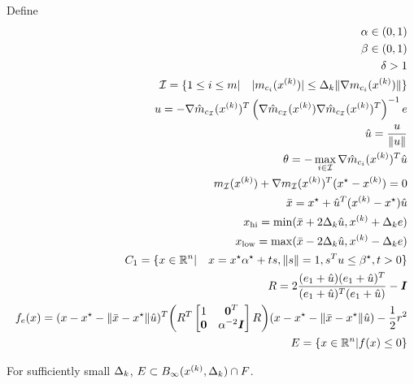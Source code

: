 % 
\begin{theorem}




Define 
\begin{align*}
\alpha \in (0, 1) \\
\beta \in (0, 1) \\
\delta > 1 \\
\mathcal I = \{1\le i \le m | \quad |m_{c_i}({x^{(k)}})| \le \Delta_k\|\nabla m_{c_i}({x^{(k)}})\|\} \\
u = -\nabla \hat m_{c_{\mathcal I}}({x^{(k)}})^T\left(\nabla \hat m_{c_{\mathcal I}}({x^{(k)}})\nabla \hat m_{c_{\mathcal I}}({x^{(k)}})^T\right)^{-1} e\\
\hat u = \frac {u} {\| u\|}\\
\theta = -\max_{i \in \mathcal I} \nabla \hat m_{c_{i}}({x^{(k)}})^T \hat u \\
m_{\mathcal I}({x^{(k)}}) + \nabla m_{\mathcal I}({x^{(k)}})^T (x^{\star} - {x^{(k)}}) = 0 \\
\bar x = x^{\star} + \hat u^T({x^{(k)}} - x^{\star}) \hat u \\
x_{\text{hi}} = \min(\bar x + 2\Delta_k\hat u, {x^{(k)}} + \Delta_k e) \\
x_{\text{low}} = \max(\bar x - 2\Delta_k\hat u, {x^{(k)}} - \Delta_k e) \\
C_1 = \{x \in \mathbb R^n | \quad x = x^{\star} \alpha^{\star} + ts, \|s\| = 1, s^Tu \le \beta^{\star}, t > 0 \} \\
R = 2\frac{(e_1 + \hat u)(e_1 + \hat u)^T}{(e_1 + \hat u)^T(e_1 + \hat u)} - \boldsymbol I \\
f_e(x) = (x - x^{\star} - \|\bar x - x^{\star} \|\hat u)^T\bigg(R^T\begin{bmatrix}
1 & \boldsymbol0^T \\
\boldsymbol 0 & \alpha^{-2} \boldsymbol I \\
\end{bmatrix}R\bigg)(x - x^{\star} - \|\bar x - x^{\star} \|\hat u) - \frac 1 2 r^2 \\
E = \{x \in \mathbb R^n | f(x) \le 0\} \\
\end{align*}

For sufficiently small $\Delta_k$, $E \subset B_{\infty}({x^{(k)}}, \Delta_k) \cap F$.


\end{theorem}

